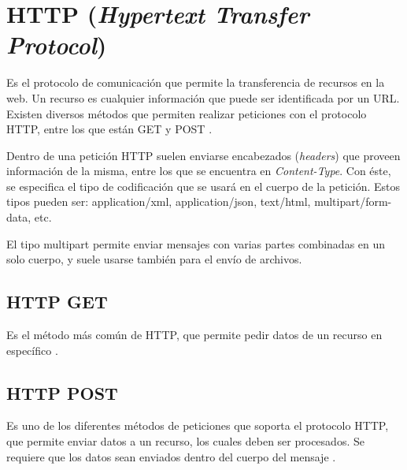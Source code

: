 \section{HTTP (\textit{Hypertext Transfer Protocol})}\label{HTTP}

Es el protocolo de comunicación que permite la transferencia de recursos en la web. Un recurso es cualquier información que puede ser identificada por un URL. Existen diversos métodos que permiten realizar peticiones con el protocolo HTTP, entre los que están GET y POST \cite{HTTP2}. 

Dentro de una petición HTTP suelen enviarse encabezados (\textit{headers}) que proveen información de la misma, entre los que se encuentra en \textit{Content-Type}. Con éste, se especifica el tipo de codificación que se usará en el cuerpo de la petición. Estos tipos pueden ser: application/xml, application/json, text/html, multipart/form-data, etc. 

El tipo multipart permite enviar mensajes con varias partes combinadas en un solo cuerpo, y suele usarse también para el envío de archivos. \cite{HTTP1}


\subsection{HTTP GET}

Es el método más común de HTTP, que permite pedir datos de un recurso en específico \cite{HTTP3}. 

\subsection{HTTP POST}

Es uno de los diferentes métodos de peticiones que soporta el protocolo HTTP, que permite enviar datos a un recurso, los cuales deben ser procesados. Se requiere que los datos sean enviados dentro del cuerpo del mensaje \cite{HTTP3}.

